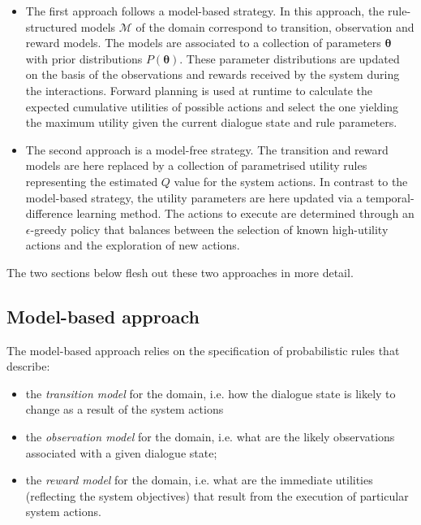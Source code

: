 \begin{itemize}
\item The first approach follows a model-based strategy.  In this approach, the rule-structured models $\mathcal{M}$ of the domain correspond to transition, observation and reward models. The models are associated to a collection of parameters $\boldsymbol\theta$ with prior distributions $P(\boldsymbol\theta)$.  These parameter distributions are updated on the basis of the observations and rewards received by the system during the interactions. Forward planning is used at runtime to calculate the expected cumulative utilities of possible actions and select the one yielding the maximum utility given the current dialogue state and rule parameters. 

\item The second approach is a model-free strategy.  The transition and reward models are here replaced by  a collection of parametrised utility rules representing the estimated $Q$ value for the system actions. In contrast to the model-based strategy, the utility parameters are here updated via a temporal-difference learning method.  The actions to execute are determined through an $\epsilon$-greedy policy that balances between the selection of known high-utility actions and the exploration of new actions.

\end{itemize}

The two sections below flesh out these two approaches in more detail. 

\subsection{Model-based approach}

The model-based approach relies on the specification of probabilistic rules that describe:
\begin{itemize}
\item the \textit{transition model} for the domain, i.e. how the dialogue state is likely to change as a result of the system actions
\item the \textit{observation model} for the domain, i.e. what are the likely observations associated with a given dialogue state;
\item the \textit{reward model} for the domain, i.e. what are the immediate utilities (reflecting the system objectives) that result from the execution of particular system actions.
\end{itemize}

